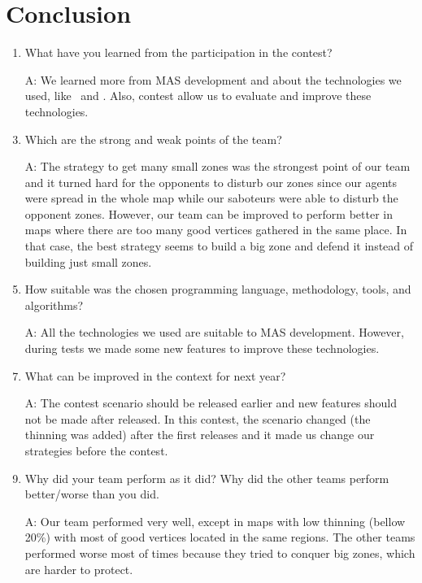 \section{Conclusion}
\begin{enumerate}
\item What have you learned from the participation in the contest?
	\item[A:] We learned more from MAS development and about the technologies we used, like \moise\ and \cartago. Also, contest allow us to evaluate and improve these technologies.\\
	
	
\item Which are the strong and weak points of the team?
	\item[A:] The strategy to get many small zones was the strongest point of our team and it turned hard for the opponents to disturb our zones since our agents were spread in the whole map while our saboteurs were able to disturb the opponent zones. However, our team can be improved to perform better in maps where there are too many good vertices gathered in the same place. In that case, the best strategy seems to build a big zone and defend it instead of building just small zones.\\
	
\item How suitable was the chosen programming language, methodology, tools, and algorithms?
	\item[A:] All the technologies we used are suitable to MAS development. However, during tests we made some new features to improve these technologies. \\
	
\item What can be improved in the context for next year?
	\item[A:] The contest scenario should be released earlier and new features should not be made after released. In this contest, the scenario changed (the thinning was added) after the first releases and it made us change our strategies before the contest.\\
	
	
\item Why did your team perform as it did? Why did the other teams perform better/worse than you did.
	\item[A:] Our team performed very well, except in maps with low thinning (bellow 20\%) with most of good vertices  located in the same regions. The other teams performed worse most of times because they tried to conquer big zones, which are harder to protect. \\
	

\end{enumerate}
